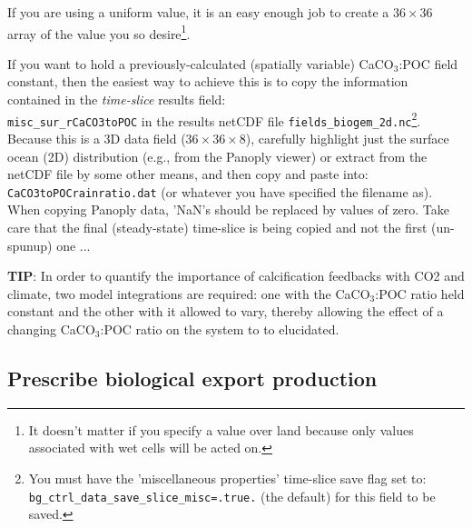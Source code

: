 \documentclass[11pt,fleqn]{book} %
\begin{document}
If you are using a uniform value, it is an easy enough job to create a \begin{math}36\times36\end{math} array of the value you so desire\footnote{It doesn't matter if you specify a value over land because only values associated with wet cells will be acted on.}.

If you want to hold a previously-calculated (spatially variable) CaCO\begin{math}_3\end{math}:POC field constant, then the easiest way to achieve this is to copy the information contained in the \textit{time-slice} results field:\\
\texttt{misc\_sur\_rCaCO3toPOC} in the results netCDF file \texttt{fields\_biogem\_2d.nc}\footnote{You must have the 'miscellaneous properties' time-slice save flag set to:\\
\texttt{bg\_ctrl\_data\_save\_slice\_misc=.true.} (the default) for this field to be saved.}. Because this is a 3D data field (\begin{math}36\times36\times8\end{math}), carefully highlight just the surface ocean (2D) distribution (e.g., from the Panoply viewer) or extract from the netCDF file by some other means, and then copy and paste into:\\
\texttt{CaCO3toPOCrainratio.dat} (or whatever you have specified the filename as). When copying Panoply data, 'NaN's should be replaced by values of zero. Take care that the final (steady-state) time-slice is being copied and not the first (un-spunup) one ...

\textbf{TIP}: In order to quantify the importance of calcification feedbacks with CO2 and climate, two model integrations are required: one with the CaCO\begin{math}_3\end{math}:POC ratio held constant and the other with it allowed to vary, thereby allowing the effect of a changing CaCO\begin{math}_3\end{math}:POC ratio on the system to to elucidated.

%
\newpage
\subsection*{Prescribe biological export production}
\vspace{1mm}
\end{document}

